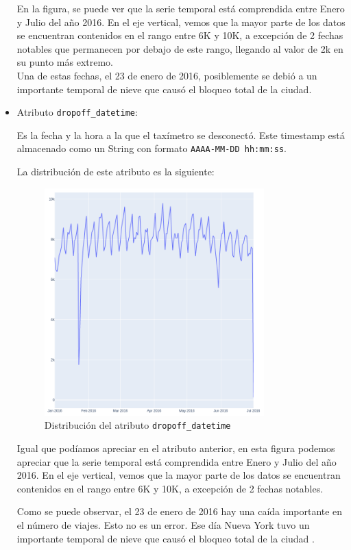 \documentclass[12pt]{article}
\begin{document}
\begin{itemize}
En la figura, se puede ver que la serie temporal está comprendida entre Enero y Julio del año 2016. En el eje vertical, vemos que la mayor parte de los datos se encuentran contenidos en el rango entre 6K y 10K, a excepción de 2 fechas notables que permanecen por debajo de este rango, llegando al valor de 2k en su punto más extremo.\\

Una de estas fechas, el 23 de enero de 2016, posiblemente se debió a un importante temporal de nieve que causó el bloqueo total de la ciudad.

    \item Atributo \texttt{dropoff\_datetime}:

Es la fecha y la hora a la que el taxímetro se desconectó. Este timestamp está almacenado como un String con formato \texttt{AAAA-MM-DD hh:mm:ss}.

La distribución de este atributo es la siguiente:

\begin{figure}[H]
    \centering
    \includegraphics[width=0.8\textwidth]{dropoff_datetime.PNG}
    \caption{Distribución del atributo \texttt{dropoff\_datetime}}
    \label{fig:dropoff_datetime}
\end{figure}

Igual que podíamos apreciar en el atributo anterior, en esta figura podemos apreciar que la serie temporal está comprendida entre Enero  y Julio del año 2016. En el eje vertical, vemos que la mayor parte de los datos se encuentran contenidos en el rango entre 6K y 10K, a excepción de 2 fechas notables.

Como se puede observar, el 23 de enero de 2016 hay una caída importante en el número de viajes. Esto no es un error. Ese día Nueva York tuvo un importante temporal de nieve que causó el bloqueo total de la ciudad \cite{BBC}.
\end{itemize}
\newpage
\end{document}
